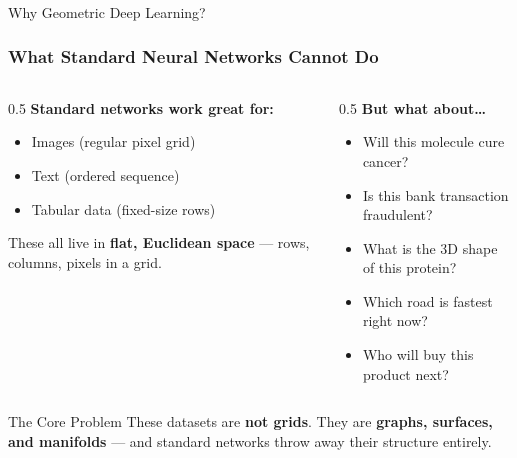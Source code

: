 \begin{frame}[fragile]\frametitle{}
\begin{center}
{\Large Why Geometric Deep Learning?}
\end{center}
\end{frame}

\begin{frame}[fragile]\frametitle{What Standard Neural Networks Cannot Do}
\begin{columns}
\begin{column}{0.5\textwidth}
\textbf{Standard networks work great for:}
\begin{itemize}
  \item Images (regular pixel grid)
  \item Text (ordered sequence)
  \item Tabular data (fixed-size rows)
\end{itemize}
\vspace{0.3cm}
These all live in \textbf{flat, Euclidean space} --- rows, columns, pixels in a grid.
\end{column}
\begin{column}{0.5\textwidth}
\textbf{But what about\ldots}
\begin{itemize}
  \item Will this molecule cure cancer?
  \item Is this bank transaction fraudulent?
  \item What is the 3D shape of this protein?
  \item Which road is fastest right now?
  \item Who will buy this product next?
\end{itemize}
\end{column}
\end{columns}
\vspace{0.3cm}
\begin{alertblock}{The Core Problem}
These datasets are \textbf{not grids}. They are \textbf{graphs, surfaces, and manifolds} --- and standard networks throw away their structure entirely.
\end{alertblock}
\end{frame}

